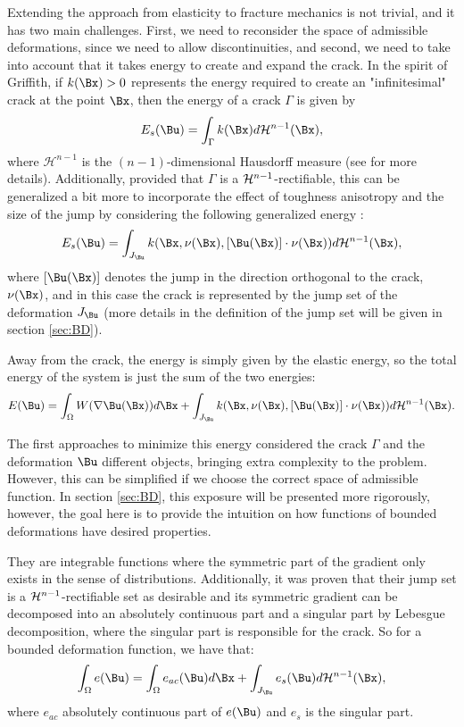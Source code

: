 Extending the approach from elasticity to fracture mechanics is not trivial, and it has two main challenges. First, we need to reconsider the space of admissible deformations, since we need to allow discontinuities, and second, we need to take into account that it takes energy to create and expand the crack. In the spirit of Griffith, if $k(\Bx)>0$ represents the energy required to create an "infinitesimal" crack at the point $\Bx$, then the energy of a crack $\Gamma$ is given by
\begin{equation*}
    E_s(\Bu)=\int_{\Gamma} k(\Bx)  d\mathcal{H}^{n-1}(\Bx),
\end{equation*}
where $\mathcal{H}^{n-1}$ is the $(n-1)$-dimensional Hausdorff measure (see \cite{evansGa} for more details). Additionally, provided that $\Gamma$ is a ${\mathcal H}^{n-1}$-rectifiable, this can be generalized a bit more to incorporate the effect of toughness anisotropy and the size of the jump by considering the following generalized  energy :
\begin{equation*}
    \label{eq:crackEnergy}
    E_s(\Bu)=\int_{J_\Bu} k(\Bx,\Gv(\Bx),[\Bu(\Bx)]\cdot\Gv(\Bx))d\mathcal{H}^{n-1}(\Bx),
\end{equation*}
where $[\Bu(\Bx)]$ denotes the jump in the direction orthogonal to the crack, $\nu(\Bx)$, and in this case the crack is represented by the jump set of the deformation $J_\Bu$ (more details in the definition of the jump set will be given in section \ref{sec:BD}).

Away from the crack, the energy is simply given by the elastic energy, so the total energy of the system is just the sum of the two energies:
\begin{equation*}
    \label{eq:totalEnergy}
    E(\Bu)=\int_\Omega W(\nabla \Bu(\Bx))d\Bx + \int_{J_\Bu} k(\Bx,\Gv(\Bx),[\Bu(\Bx)]\cdot\Gv(\Bx))d\mathcal{H}^{n-1}(\Bx).
\end{equation*} 

The first approaches to minimize this energy considered the crack $\Gamma$ and the deformation $\Bu$ different objects, bringing extra complexity to the problem. However, this can be simplified if we choose the correct space of admissible function. In section \ref{sec:BD}, this exposure will be presented more rigorously, however, the goal here is to provide the intuition on how functions of bounded deformations have desired properties. 

They are integrable functions where the symmetric part of the gradient only exists in the sense of distributions. Additionally, it was proven that their jump set is a ${\mathcal H}^{n-1}$-rectifiable set as desirable and its symmetric gradient can be decomposed into an absolutely continuous part and a singular part by Lebesgue decomposition, where the singular part is responsible for the crack. So for a bounded deformation function, we have that:
$$\int_\Omega e(\Bu) =\int_\Omega e_{ac} (\Bu) d\Bx + \int_{J_\Bu} e_s(\Bu) d \CH^{n-1}(\Bx),$$
where $e_{ac}$  absolutely continuous part  of $e(\Bu)$ and $e_s$ is the singular part. 

